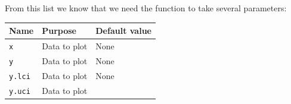 \documentclass[12pt,]{book}
\theoremstyle{definition}
\theoremstyle{definition}
\theoremstyle{definition}
\theoremstyle{remark}
\begin{document}
From this list we know that we need the function to take several
parameters:

\begin{longtable}[]{@{}lll@{}}
\toprule
\begin{minipage}[b]{0.15\columnwidth}\raggedright
\textbf{Name}\strut
\end{minipage} & \begin{minipage}[b]{0.32\columnwidth}\raggedright
\textbf{Purpose}\strut
\end{minipage} & \begin{minipage}[b]{0.39\columnwidth}\raggedright
\textbf{Default value}\strut
\end{minipage}\tabularnewline
\midrule
\endhead
\begin{minipage}[t]{0.15\columnwidth}\raggedright
\texttt{x}\strut
\end{minipage} & \begin{minipage}[t]{0.32\columnwidth}\raggedright
Data to plot\strut
\end{minipage} & \begin{minipage}[t]{0.39\columnwidth}\raggedright
None\strut
\end{minipage}\tabularnewline
\begin{minipage}[t]{0.15\columnwidth}\raggedright
\texttt{y}\strut
\end{minipage} & \begin{minipage}[t]{0.32\columnwidth}\raggedright
Data to plot\strut
\end{minipage} & \begin{minipage}[t]{0.39\columnwidth}\raggedright
None\strut
\end{minipage}\tabularnewline
\begin{minipage}[t]{0.15\columnwidth}\raggedright
\texttt{y.lci}\strut
\end{minipage} & \begin{minipage}[t]{0.32\columnwidth}\raggedright
Data to plot\strut
\end{minipage} & \begin{minipage}[t]{0.39\columnwidth}\raggedright
None\strut
\end{minipage}\tabularnewline
\begin{minipage}[t]{0.15\columnwidth}\raggedright
\texttt{y.uci}\strut
\end{minipage} & \begin{minipage}[t]{0.32\columnwidth}\raggedright
Data to plot\strut
\end{minipage} & \begin{minipage}[t]{0.39\columnwidth}\raggedright

\end{minipage}
\end{longtable}
\end{document}
